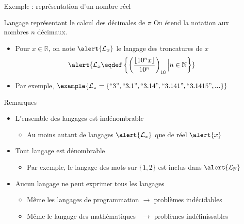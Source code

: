 
\begingroup


\begin{frame}{Exemple : représentation d'un nombre réel}
  \begin{block}{Langage représentant le calcul des décimales de $\pi$}
    On étend la notation  aux nombres $n$ décimaux. 
    \begin{itemize}
    \item Pour $x\in \mathbb{R}$, on note $\alert{\mathcal{L}_{x}}$ le langage des troncatures de $x$
      $$\alert{\mathcal{L}_{x} \eqdef \left\{\left(\frac{\left\lfloor 10^n x \right\rfloor}{10^n} \right)_{10} \Big| n \in \mathbb{N}\right\}}$$
    \item Par exemple, $\example{\mathcal{L}_{\pi} = \left\{\text{``3''}, \text{``3.1''}, \text{``3.14''}, \text{``3.141''}, \text{``3.1415''}, ...   \right\}}$
    \end{itemize}
  \end{block}
  \pause
  \vspace{-2mm}
  \begin{alertblock}{Remarques}
    \vspace{-1mm}
    \begin{itemize}
    \item L'ensemble des langages est indénombrable
      \begin{itemize}
      \item Au moins autant de langages $\alert{\mathcal{L}_{x}}$ que de réel $\alert{x}$
      \end{itemize}
    \item Tout langage est dénombrable
      \begin{itemize}
      \item Par exemple, le langage des mots sur $\{1, 2\}$ est inclus dans $\alert{\mathcal{L}_{\mathbb{N}}}$
      \end{itemize}
    \item Aucun langage ne peut exprimer tous les langages 
      \begin{itemize}
      \item Même les langages de programmation $\rightarrow$ \alert{problèmes indécidables}
      \item Même le langage des mathématiques ~$\rightarrow$ \alert{problèmes indéfinissables}
      \end{itemize}
    \end{itemize}
  \end{alertblock}
\end{frame}

\endgroup
